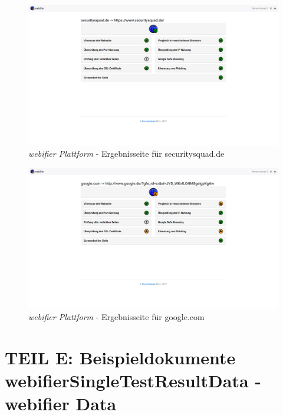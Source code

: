 \begin{landscape}
\begin{figure}[H]
  \centering
  \includegraphics[width=\textheight]{images/platform/screenshot-securitysquad}
  \caption{\textit{webifier Plattform} - Ergebnisseite für securitysquad.de}
\end{figure}


\begin{figure}[H]
  \centering
  \includegraphics[width=\textheight]{images/platform/screenshot-google}
  \caption{\textit{webifier Plattform} - Ergebnisseite für google.com}
\end{figure}


\end{landscape}

\newpage

\section*{TEIL E: Beispieldokumente webifierSingleTestResultData - webifier Data}
\label{app:e}

